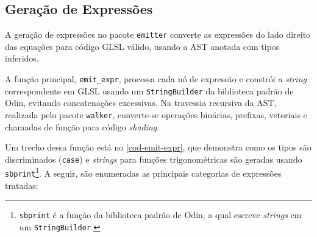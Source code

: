 \subsection{Geração de Expressões} \label{sec-RHS}

A geração de expressões no pacote \texttt{emitter} converte as expressões do lado direito das equações para código GLSL válido, usando a AST anotada com tipos inferidos.

A função principal, \verb"emit_expr", processa cada nó de expressão e constrói a \textit{string} correspondente em GLSL usando um \verb"StringBuilder" da biblioteca padrão de Odin, evitando concatenações excessivas. Na travessia recursiva da AST, realizada pelo pacote \texttt{walker}, converte-se operações binárias, prefixas, vetoriais e chamadas de função para código \textit{shading}.

Um trecho dessa função está no \autoref{cod-emit-expr}, que demonstra como os tipos são discriminados (\texttt{case}) e \textit{strings} para funções trigonométricas são geradas usando \verb|sbprint|\footnote{\texttt{sbprint} é a função da biblioteca padrão de Odin, a qual escreve \textit{strings} em um \texttt{StringBuilder}.}. A seguir, são enumeradas as principais categorias de expressões tratadas:

